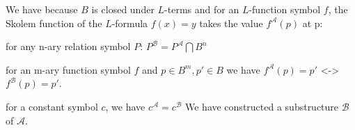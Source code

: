 \documentclass[12pt]{article}
\begin{document}
We have because $B$ is closed under $L$-terms and for an $L$-function symbol $f$, the Skolem function of the $L$-formula $f(x)=y$ takes the value $f^\mathcal{A}(p)$ at p:  

          for any n-ary relation symbol $P$:  $P^\mathcal{B}=P^\mathcal{A}\bigcap B^n$

          for an m-ary function symbol $f$ and $p \in B^m , p' \in B$ we have $f^\mathcal{A}(p)=p'$ <-> $f^\mathcal{B}(p)=p'$.

          for a constant symbol $c$, we have $c^\mathcal{A}=c^\mathcal{B}$ We have constructed a substructure $\mathcal{B}$ of $\mathcal{A}$.
\end{document}
